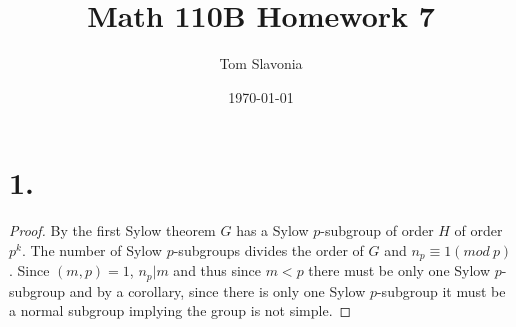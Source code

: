 \documentclass{article}
\title{Math 110B Homework 7}
\author{Tom Slavonia}
\date{\today}
\begin{document}
\maketitle

\section*{1.}
\begin{proof}
    By the first Sylow theorem $G$ has a Sylow $p$-subgroup of order $H$ of order $p^k$. The number of Sylow $p$-subgroups divides the order of $G$ and $n_p \equiv 1 (mod \ p)$. Since $(m, p) = 1$, $n_p | m$ and thus since $m < p$ there must be only one Sylow $p$-subgroup and by a corollary, since there is only one Sylow $p$-subgroup it must be a normal subgroup implying the group is not simple. 
\end{proof}
\end{document}
